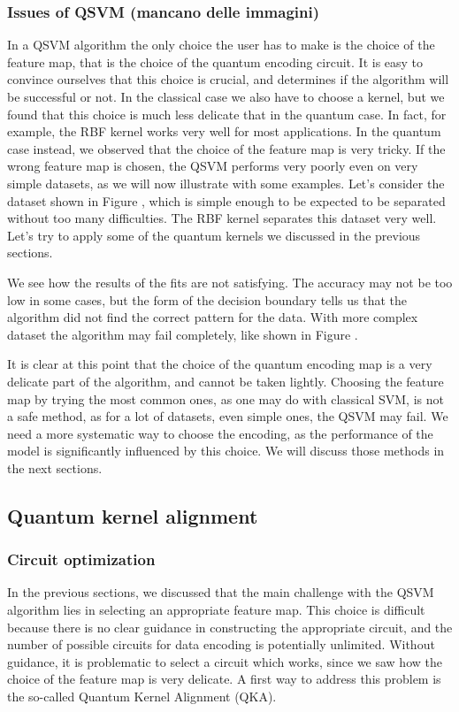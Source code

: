 \documentclass[12pt]{article}
\begin{document}
\subsubsection{Issues of QSVM (mancano delle immagini)}

In a QSVM algorithm the only choice the user has to make is the choice of the feature map, that is the choice of the quantum encoding circuit. It is easy to convince ourselves that this choice is crucial, and determines if the algorithm will be successful or not. In the classical case we also have to choose a kernel, but we found that this choice is much less delicate that in the quantum case. In fact, for example, the RBF kernel works very well for most applications. In the quantum case instead, we observed that the choice of the feature map is very tricky. If the wrong feature map is chosen, the QSVM performs very poorly even on very simple datasets, as we will now illustrate with some examples. Let's consider the dataset shown in Figure , which is simple enough to be expected to be separated without too many difficulties. The RBF kernel separates this dataset very well. Let's try to apply some of the quantum kernels we discussed in the previous sections. 


We see how the results of the fits are not satisfying. The accuracy may not be too low in some cases, but the form of the decision boundary tells us that the algorithm did not find the correct pattern for the data. With more complex dataset the algorithm may fail completely, like shown in Figure .

It is clear at this point that the choice of the quantum encoding map is a very delicate part of the algorithm, and cannot be taken lightly. Choosing the feature map by trying the most common ones, as one may do with classical SVM, is not a safe method, as for a lot of datasets, even simple ones, the QSVM may fail. We need a more systematic way to choose the encoding, as the performance of the model is significantly influenced by this choice. We will discuss those methods in the next sections.

\subsection{Quantum kernel alignment}
\subsubsection{Circuit optimization}

In the previous sections, we discussed that the main challenge with the QSVM algorithm lies in selecting an appropriate feature map. This choice is difficult because there is no clear guidance in constructing the appropriate circuit, and the number of possible circuits for data encoding is potentially unlimited. Without guidance, it is problematic to select a circuit which works, since we saw how the choice of the feature map is very delicate. A first way to address this problem is the so-called Quantum Kernel Alignment (QKA). 
\end{document}
